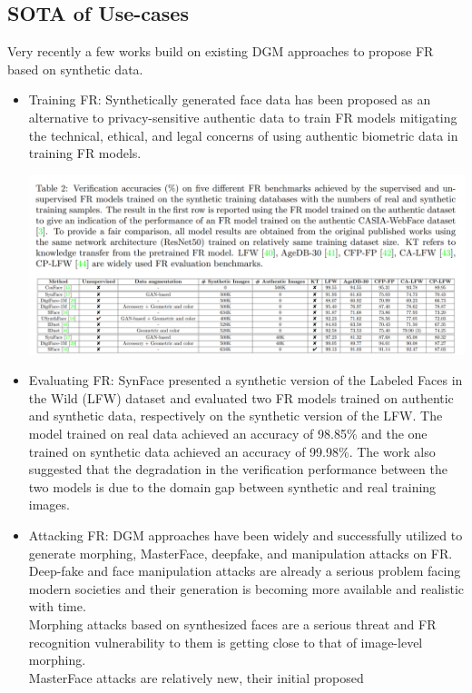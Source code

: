 \documentclass[12pt]{article}
\begin{document}
\subsection{SOTA of Use-cases}
Very recently a few works build on existing DGM approaches to propose FR based on synthetic data. 
\begin{itemize}
  \item Training FR: Synthetically generated face data has been
  proposed as an alternative to privacy-sensitive authentic data to train FR models mitigating the technical, ethical, and legal concerns of using authentic biometric data in training FR models.
  \begin{center}
    \includegraphics[scale = 0.6]{img3.png}
  \end{center}
  \item Evaluating FR:  SynFace presented a synthetic
  version of the Labeled Faces in the Wild (LFW)
  dataset and evaluated two FR models trained
  on authentic and synthetic data, respectively on the
  synthetic version of the LFW. The model trained on
  real data achieved an accuracy of 98.85\% and the
  one trained on synthetic data achieved an accuracy
  of 99.98\%. The work also suggested that the
  degradation in the verification performance between
  the two models is due to the domain gap between
  synthetic and real training images.
  \item Attacking FR: DGM approaches have been widely and successfully
  utilized to generate morphing, MasterFace, deepfake, and manipulation attacks on FR. Deep-fake and face manipulation
  attacks are already a serious problem facing modern societies and their generation is becoming more
  available and realistic with time.\\ Morphing attacks based on synthesized faces are a serious threat
  and FR recognition vulnerability to them is getting
  close to that of image-level morphing.\\ MasterFace attacks are relatively new, their initial proposed

\end{itemize}
\end{document}
